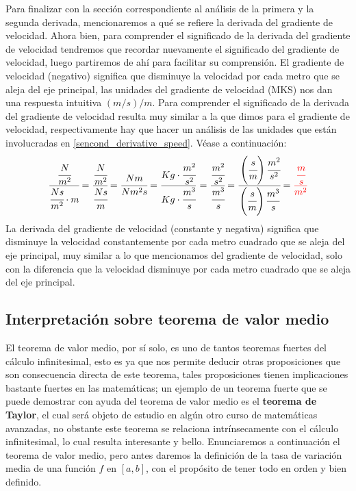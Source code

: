 Para finalizar con la sección correspondiente al análisis de la primera y la segunda derivada, mencionaremos a qué se refiere la derivada del gradiente de velocidad. Ahora bien, para comprender el significado de la derivada del gradiente de velocidad tendremos que recordar nuevamente el significado del gradiente de velocidad, luego partiremos de ahí para facilitar su comprensión. El gradiente de velocidad (negativo) significa que disminuye la velocidad por cada metro que se aleja del eje principal, las unidades del gradiente de velocidad (MKS) nos dan una respuesta intuitiva $\left(m/s\right)/m$. Para comprender el significado de la derivada del gradiente de velocidad resulta muy similar a la que dimos para el gradiente de velocidad, respectivamente hay que hacer un análisis de las unidades que están involucradas en \ref{sencond_derivative_speed}. Véase a continuación:
\begin{align*}
    \cfrac{\cfrac{N}{m^2}}{\cfrac{Ns}{m^2}\cdot m}=\cfrac{\cfrac{N}{m^2}}{\cfrac{Ns}{m}}=\cfrac{Nm}{Nm^2s}=\frac{Kg\cdot\cfrac{m^2}{s^2}}{Kg\cdot\cfrac{m^3}{s}}=\cfrac{\cfrac{m^2}{s^2}}{\cfrac{m^3}{s}}=\cfrac{\left(\cfrac{s}{m}\right)\cfrac{m^2}{s^2}}{\left(\cfrac{s}{m}\right)\cfrac{m^3}{s}}=\textcolor{red}{\cfrac{\cfrac{m}{s}}{m^2}}
\end{align*}
La derivada del gradiente de velocidad (constante y negativa) significa que disminuye la velocidad constantemente por cada metro cuadrado que se aleja del eje principal, muy similar a lo que mencionamos del gradiente de velocidad, solo con la diferencia que la velocidad disminuye por cada metro cuadrado que se aleja del eje principal.

\subsection{Interpretación sobre teorema de valor medio}
El teorema de valor medio, por sí solo, es uno de tantos teoremas fuertes del cálculo infinitesimal, esto es ya que nos permite deducir otras proposiciones que son consecuencia directa de este teorema, tales proposiciones tienen implicaciones bastante fuertes en las matemáticas; un ejemplo de un teorema fuerte que se puede demostrar con ayuda del teorema de valor medio es el \textbf{teorema de Taylor}, el cual será objeto de estudio en algún otro curso de matemáticas avanzadas, no obstante este teorema se relaciona intrínsecamente con el cálculo infinitesimal, lo cual resulta interesante y bello. Enunciaremos a continuación el teorema de valor medio, pero antes daremos la definición de la tasa de variación media de una función $f$ en $[a,b]$, con el propósito de tener todo en orden y bien definido.
\vspace{0.9cm}
